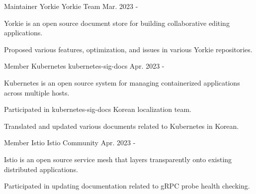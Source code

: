 

\begin{cventries}

  \cventry
    {Maintainer} %
    {Yorkie} %
    {Yorkie Team} %
    {Mar. 2023 - } %
    {
      \begin{cvitems} %
        \item {Yorkie is an open source document store for building collaborative editing applications.}
        \item {Proposed various features, optimization, and issues in various Yorkie repositories.}
      \end{cvitems}
    }

  \cventry
  {Member} %
  {Kubernetes} %
  {kubernetes-sig-docs} %
  {Apr. 2023 - } %
  {
    \begin{cvitems} %
      \item {Kubernetes is an open source system for managing containerized applications across multiple hosts.}
      \item {Participated in kubernetes-sig-docs Korean localization team.}
      \item {Translated and updated various documents related to Kubernetes in Korean.}      
    \end{cvitems}
  }

  \cventry
    {Member} %
    {Istio} %
    {Istio Community} %
    {Apr. 2023 - } %
    {
      \begin{cvitems} %
        \item {Istio is an open source service mesh that layers transparently onto existing distributed applications.}
        \item {Participated in updating documentation related to gRPC probe health checking.}
      \end{cvitems}
    }


\end{cventries}
